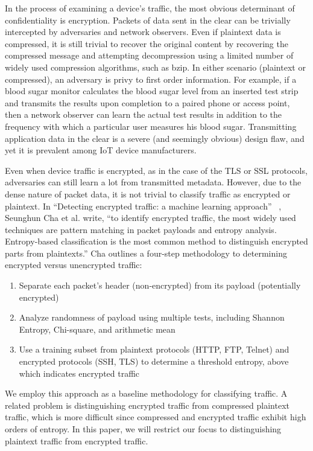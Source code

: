 In the process of examining a device's traffic, the most obvious determinant of confidentiality is encryption. Packets of data sent in the clear can be trivially intercepted by adversaries and network observers. Even if plaintext data is compressed, it is still trivial to recover the original content by recovering the compressed message and attempting decompression using a limited number of widely used compression algorithms, such as bzip. In either scenario (plaintext or compressed), an adversary is privy to first order information. For example, if a blood sugar monitor calculates the blood sugar level from an inserted test strip and transmits the results upon completion to a paired phone or access point, then a network observer can learn the actual test results in addition to the frequency with which a particular user measures his blood sugar. Transmitting application data in the clear is a severe (and seemingly obvious) design flaw, and yet it is prevalent among IoT device manufacturers. 

Even when device traffic is encrypted, as in the case of the TLS or SSL protocols, adversaries can still learn a lot from transmitted metadata. However, due to the dense nature of packet data, it is not trivial to classify traffic as encrypted or plaintext. In ``Detecting encrypted traffic: a machine learning approach'' ~\cite{chaMachineLearning}, Seunghun Cha et al. write, ``to identify encrypted traffic, the most widely used techniques are pattern matching in packet payloads and entropy analysis. Entropy-based classification is the most common method to distinguish encrypted parts from plaintexts.'' Cha outlines a four-step methodology to determining encrypted versus unencrypted traffic:

\begin{enumerate}
  \item Separate each packet's header (non-encrypted) from its payload (potentially encrypted)
  \item Analyze randomness of payload using multiple tests, including Shannon Entropy, Chi-square, and arithmetic mean
  \item Use a training subset from plaintext protocols (HTTP, FTP, Telnet) and encrypted protocols (SSH, TLS) to determine a threshold entropy, above which indicates encrypted traffic
\end{enumerate}

We employ this approach as a baseline methodology for classifying traffic. A related problem is distinguishing encrypted traffic from compressed plaintext traffic, which is more difficult since compressed and encrypted traffic exhibit high orders of entropy. In this paper, we will restrict our focus to distinguishing plaintext traffic from encrypted traffic.  

